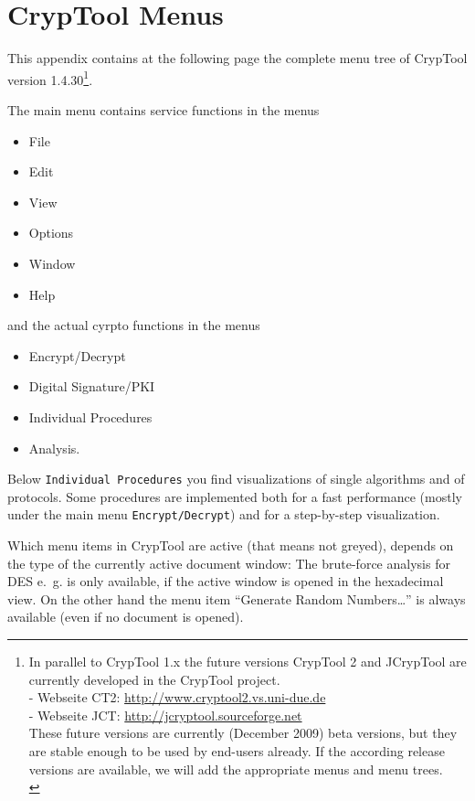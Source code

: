
\newpage
\enlargethispage{1cm}
\hypertarget{appendix-menutree}{}
\section{CrypTool Menus}
\label{s:appendix-menutree}

This appendix contains at the following page the complete menu tree of
CrypTool version 1.4.30\footnote{%
  In parallel to CrypTool 1.x the future versions
  CrypTool 2 and JCrypTool
  are currently developed in the CrypTool project.\\
  - Webseite CT2: \url{http://www.cryptool2.vs.uni-due.de} \\
  - Webseite JCT: \url{http://jcryptool.sourceforge.net} \\
  These future versions are currently (December 2009) beta versions, but they
  are stable enough to be used by end-users already. If the according release
  versions are available, we will add the appropriate menus and menu trees.\\
}. 

\noindent The main menu contains service functions in the menus
\begin{itemize}
   \item File
   \item Edit
   \item View
   \item Options
   \item Window
   \item Help
\end{itemize}
and the actual cyrpto functions in the menus
\begin{itemize}
   \item Encrypt/Decrypt
   \item Digital Signature/PKI
   \item Individual Procedures
   \item Analysis.
\end{itemize}

Below \verb#Individual Procedures# you find visualizations of single algorithms
and of protocols. Some procedures are implemented both for a fast performance
(mostly under the main menu \verb#Encrypt/Decrypt#) and for a step-by-step visualization.

Which menu items in CrypTool are active (that means not greyed), depends on
the type of the currently active document window:
The brute-force analysis for DES e.~g. is only
available, if the active window is opened in the hexadecimal view. 
On the other hand the menu item ``Generate Random Numbers\dots''
is always available (even if no document is opened).

